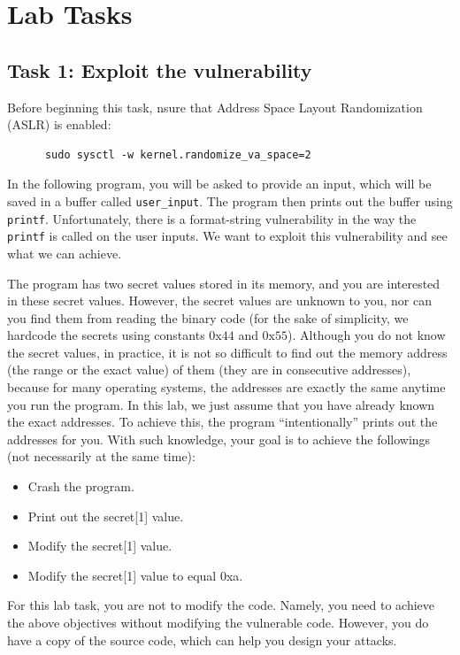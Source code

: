 \section{Lab Tasks}

\subsection{Task 1: Exploit the vulnerability}
Before beginning this task, nsure that Address Space Layout Randomization (ASLR) is enabled:
\begin{verbatim}
      sudo sysctl -w kernel.randomize_va_space=2
\end{verbatim}
In the following program, you will be asked to provide an input, which
will be saved in a buffer called {\tt user\_input}. 
The program then prints out the buffer using {\tt printf}.
Unfortunately, there is a format-string vulnerability in the way
the {\tt printf} is called on the user inputs. We want to exploit
this vulnerability and see what we can achieve.

The program has two secret values stored in its memory,
and you are interested in these secret values. However, 
the secret values are unknown to you, nor can you find them from reading the 
binary code (for the sake of simplicity, we hardcode the secrets 
using constants 0x$44$ and 0x$55$). 
Although you do not know the secret values, in practice, 
it is not so difficult to find out 
the memory address (the range or the exact value) of them (they are 
in consecutive addresses), because
for many operating systems, the addresses are exactly the same anytime you 
run the program. 
In this lab, we just assume that you have already known the exact addresses. 
To achieve this,
the program ``intentionally'' prints out the addresses for you. With such
knowledge, your goal is to achieve the followings (not necessarily at the 
same time): 
\begin{itemize} 
\item Crash the program.
\item Print out the secret[1] value.
\item Modify the secret[1] value.
\item Modify the secret[1] value to equal 0xa.
\end{itemize} 

For this lab task, you are not to modify the code. Namely, you need to achieve
the above objectives without modifying the vulnerable code.
However, you do have a copy of the source code, which can help 
you design your attacks.
 
